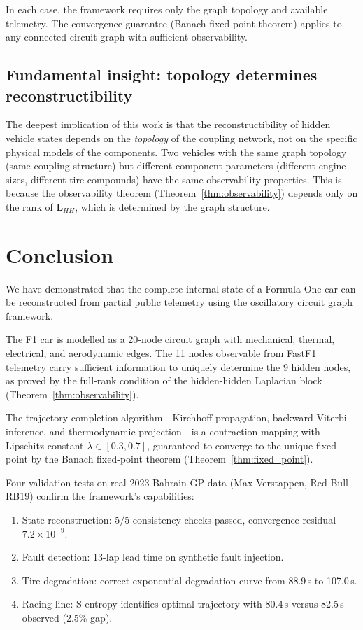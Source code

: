 \documentclass[twocolumn,10pt,a4paper]{article}
\theoremstyle{definition}
\theoremstyle{remark}
\newcommand{\mat}[1]{\mathbf{#1}}
\begin{document}
In each case, the framework requires only the graph topology and available telemetry. The convergence guarantee (Banach fixed-point theorem) applies to any connected circuit graph with sufficient observability.

\subsection{Fundamental insight: topology determines reconstructibility}

The deepest implication of this work is that the reconstructibility of hidden vehicle states depends on the \emph{topology} of the coupling network, not on the specific physical models of the components. Two vehicles with the same graph topology (same coupling structure) but different component parameters (different engine sizes, different tire compounds) have the same observability properties. This is because the observability theorem (Theorem~\ref{thm:observability}) depends only on the rank of $\mat{L}_{HH}$, which is determined by the graph structure.


\section{Conclusion}\label{sec:conclusion}

We have demonstrated that the complete internal state of a Formula One car can be reconstructed from partial public telemetry using the oscillatory circuit graph framework.

The F1 car is modelled as a 20-node circuit graph with mechanical, thermal, electrical, and aerodynamic edges. The 11 nodes observable from FastF1 telemetry carry sufficient information to uniquely determine the 9 hidden nodes, as proved by the full-rank condition of the hidden-hidden Laplacian block (Theorem~\ref{thm:observability}).

The trajectory completion algorithm---Kirchhoff propagation, backward Viterbi inference, and thermodynamic projection---is a contraction mapping with Lipschitz constant $\lambda \in [0.3, 0.7]$, guaranteed to converge to the unique fixed point by the Banach fixed-point theorem (Theorem~\ref{thm:fixed_point}).

Four validation tests on real 2023 Bahrain GP data (Max Verstappen, Red Bull RB19) confirm the framework's capabilities:
\begin{enumerate}
    \item State reconstruction: 5/5 consistency checks passed, convergence residual $7.2 \times 10^{-9}$.
    \item Fault detection: 13-lap lead time on synthetic fault injection.
    \item Tire degradation: correct exponential degradation curve from 88.9\,s to 107.0\,s.
    \item Racing line: S-entropy identifies optimal trajectory with 80.4\,s versus 82.5\,s observed (2.5\% gap).
\end{enumerate}
\end{document}
